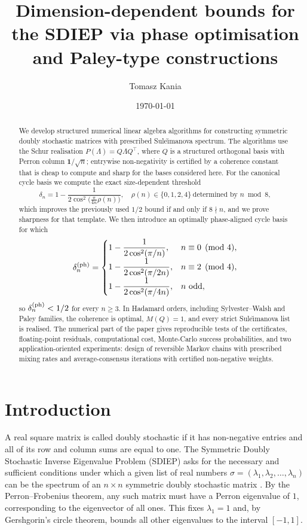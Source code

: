 \documentclass[12pt,fleqn]{amsart}
\title[Dimension-dependent bounds for the SDIEP]{Dimension-dependent bounds for the SDIEP via phase optimisation and Paley-type constructions}
\author{Tomasz Kania}
\date{\today}
\renewcommand{\ge}{\geqslant}
\theoremstyle{definition}
\theoremstyle{remark}
\newcommand{\1}{\mathbf{1}}
\begin{document}
\maketitle

\begin{abstract}
We develop structured numerical linear algebra algorithms for constructing symmetric doubly stochastic matrices with prescribed Sule\u{\i}manova spectrum.  The algorithms use the Schur realisation
\(P(\Lambda)=Q\Lambda Q^{\top}\), where \(Q\) is a structured orthogonal basis with Perron column \(\mathbf 1/\sqrt n\); entrywise non-negativity is certified by a coherence constant that is cheap to compute and sharp for the bases considered here.  For the canonical cycle basis we compute the exact size-dependent threshold
\[
\delta_n=1-\frac{1}{2\cos^2\!\Big(\frac{\pi}{4n}\rho(n)\Big)},
\quad
\rho(n)\in\{0,1,2,4\}\ \text{determined by } n\bmod 8,
\]
which improves the previously used \(1/2\) bound if and only if \(8\nmid n\), and we prove sharpness for that template.  We then introduce an optimally phase-aligned cycle basis for which
\[
\delta_n^{\rm (ph)}=
\begin{cases}
\displaystyle 1-\dfrac{1}{2\cos^2(\pi/n)},   & n\equiv 0\pmod{4},\\[2mm]
\displaystyle 1-\dfrac{1}{2\cos^2(\pi/2n)},  & n\equiv 2\pmod{4},\\[2mm]
\displaystyle 1-\dfrac{1}{2\cos^2(\pi/4n)},  & n\ \text{odd},
\end{cases}
\]
so \(\delta_n^{\rm (ph)}<1/2\) for every \(n\ge3\).  In Hadamard orders, including Sylvester--Walsh and Paley families, the coherence is optimal, \(M(Q)=1\), and every strict Sule\u{\i}manova list is realised.  The numerical part of the paper gives reproducible tests of the certificates, floating-point residuals, computational cost, Monte-Carlo success probabilities, and two application-oriented experiments: design of reversible Markov chains with prescribed mixing rates and average-consensus iterations with certified non-negative weights.
\end{abstract}

\section{Introduction}

A real square matrix is called doubly stochastic if it has non-negative entries and all of its row and column sums are equal to one. The Symmetric Doubly Stochastic Inverse Eigenvalue Problem (SDIEP) asks for the necessary and sufficient conditions under which a given list of real numbers $\sigma = (\lambda_1, \lambda_2, \dots, \lambda_n)$ can be the spectrum of an $n \times n$ symmetric doubly stochastic matrix \cite{GK20}. By the Perron--Frobenius theorem, any such matrix must have a Perron eigenvalue of $1$, corresponding to the eigenvector of all ones. This fixes $\lambda_1=1$ and, by Gershgorin's circle theorem, bounds all other eigenvalues to the interval $[-1, 1]$.\smallskip
\end{document}
